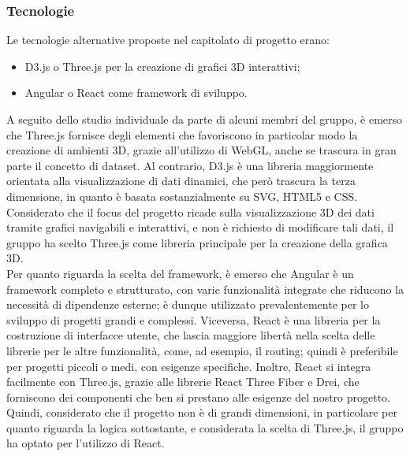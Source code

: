         \subsubsection{Tecnologie}
        Le tecnologie alternative proposte nel capitolato di progetto erano:
        \begin{itemize}
            \item D3.js o Three.js per la creazione di grafici 3D interattivi;
            \item Angular o React come framework di sviluppo.       
        \end{itemize}
        A seguito dello studio individuale da parte di alcuni membri del gruppo,
        è emerso che Three.js fornisce degli elementi che favoriscono in particolar
        modo la creazione di ambienti 3D, grazie all'utilizzo di WebGL, 
        anche se trascura in gran parte il concetto di dataset. 
        Al contrario, D3.js è una libreria maggiormente orientata
        alla visualizzazione di dati dinamici, che però trascura la terza dimensione,
        in quanto è basata sostanzialmente su SVG, HTML5 e CSS. 
        Considerato che il focus del progetto ricade sulla visualizzazione 3D dei 
        dati tramite grafici navigabili e interattivi, e non è richiesto di modificare
        tali dati, il gruppo ha scelto Three.js come libreria principale per la creazione 
        della grafica 3D.\\
        Per quanto riguarda la scelta del framework, è emerso che Angular è un framework
        completo e strutturato, con varie funzionalità integrate che riducono la necessità di dipendenze esterne;
        è dunque utilizzato prevalentemente per lo sviluppo di progetti grandi e complessi. 
        Viceversa, React è una libreria per la costruzione di interfacce utente, 
        che lascia maggiore libertà nella scelta delle librerie per le altre funzionalità,
        come, ad esempio, il routing; quindi è preferibile per progetti piccoli o medi, con esigenze specifiche.
        Inoltre, React si integra facilmente con Three.js, grazie alle 
        librerie React Three Fiber e Drei, che forniscono dei componenti che ben si 
        prestano alle esigenze del nostro progetto.
        Quindi, considerato che il progetto non è di grandi dimensioni, in particolare per quanto 
        riguarda la logica sottostante, e considerata la scelta di Three.js, il gruppo ha 
        optato per l'utilizzo di React.        
